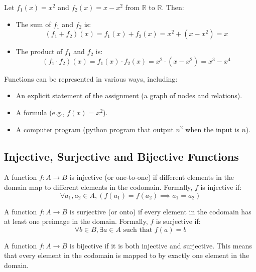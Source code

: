 \begin{eg}
    Let $f_1(x) = x^2$ and $f_2(x) = x - x^2$ from $\mathbb{R}$ to $\mathbb{R}$. Then:
    \begin{itemize}[itemsep=1pt,label=$\circ$]
        \item The sum of $f_1$ and $f_2$ is:
        \[ (f_1 + f_2)(x) = f_1(x) + f_2(x) = x^2 + (x - x^2) = x \]
        \item The product of $f_1$ and $f_2$ is:
        \[ (f_1 \cdot f_2)(x) = f_1(x) \cdot f_2(x) = x^2 \cdot (x - x^2) = x^3 - x^4 \]
    \end{itemize}
\end{eg}
Functions can be represented in various ways, including:
\begin{itemize}[itemsep=1pt,label=$\circ$]
    \item An explicit statement of the assignment (a graph of nodes and relations).
    \item A formula (e.g., $f(x) = x^2$).
    \item A computer program (python program that output $n^2$ when the input is $n$).
\end{itemize}

\subsection{Injective, Surjective and Bijective Functions}
\begin{definition}
    A function $f: A \to B$ is injective (or one-to-one) if different elements in the domain map to different elements in the codomain. Formally, $f$ is injective if:
    \[ \forall a_1, a_2 \in A, (f(a_1) = f(a_2) \implies a_1 = a_2) \]
\end{definition}

\begin{definition}
    A function $f: A \to B$ is surjective (or onto) if every element in the codomain has at least one preimage in the domain. Formally, $f$ is surjective if:
    \[ \forall b \in B, \exists a \in A \text{ such that } f(a) = b \]
\end{definition}

\begin{definition}
    A function $f: A \to B$ is bijective if it is both injective and surjective. This means that every element in the codomain is mapped to by exactly one element in the domain.
\end{definition}

